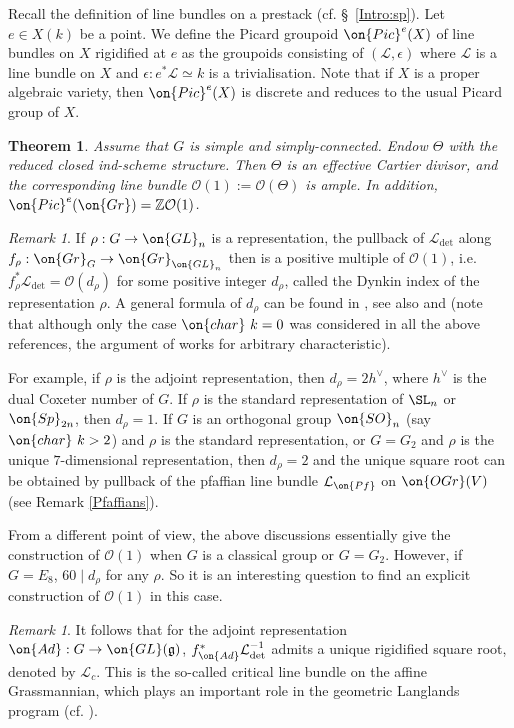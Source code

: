 \documentclass[]{pcmi}
\theoremstyle{plain}
\newtheorem{thm}[equation]{Theorem}
\theoremstyle{remark}
\newtheorem{rmk}[equation]{Remark}
\theoremstyle{definition}
\newcommand{\frakg}{{\mathfrak g}}
\newcommand{\bZ}{{\mathbb Z}}
\newcommand{\mL}{{\mathcal L}}
\newcommand{\mO}{{\mathcal O}}
\newcommand{\Ad}{{\on{Ad}}}
\newcommand{\cha}{{\on{char}}}
\newcommand{\Gr}{{\on{Gr}}}
\newcommand{\Pic}{{\on{Pic}}}
\newcommand{\GL}{{\on{GL}}}
\begin{document}
Recall the definition of line bundles on a prestack (cf. \S~\ref{Intro:sp}).
Let $e\in X(k)$ be a point. We define the Picard groupoid $\Pic^e(X)$ of line bundles on $X$ rigidified at $e$ as the groupoids consisting of $(\mL,\epsilon)$ where $\mL$ is a line bundle on $X$ and $\epsilon: e^*\mL\simeq k$ is a trivialisation.
Note that if $X$ is a proper algebraic variety, then $\Pic^e(X)$ is discrete and reduces to the usual Picard group of $X$.


\begin{thm}\label{Pic of Gr}
Assume that $G$ is simple and simply-connected.
Endow $\Theta$
with the reduced closed ind-scheme structure. Then $\Theta$ is an effective Cartier divisor, and the corresponding line bundle $\mO(1):=\mO(\Theta)$ is ample. In addition, $\Pic^e(\Gr)=\bZ\mO(1)$.
\end{thm}



\begin{rmk}\label{generator}
If $\rho: G\to \GL_n$ is a representation, the pullback of $\mL_{\det}$ along $f_\rho:\Gr_G\to \Gr_{\GL_n}$ then is a positive multiple of $\mO(1)$, i.e. $f_\rho^*\mL_{\det}=\mO(d_\rho)$ for some positive integer $d_\rho$, called the Dynkin index of the representation $\rho$. A general formula of $d_\rho$ can be found in \cite[Lemma 5.2]{KNR}, see also \cite[Lemma 10.6.1]{So} and \cite[Lemma 4.2]{YZ} (note that although only the case $\cha\ k=0$ was considered in all the above references, the argument of \cite[Lemma 4.2]{YZ} works for arbitrary characteristic).

For example, if $\rho$ is the adjoint representation, then $d_\rho=2h^\vee$, where $h^\vee$ is the dual Coxeter number of $G$. If $\rho$ is the standard representation of $\SL_n$ or $\on{Sp}_{2n}$, then $d_\rho=1$. If $G$ is an orthogonal group $\on{SO}_n$ (say $\cha\ k>2$) and $\rho$ is the standard representation, or $G=G_2$ and $\rho$ is the unique $7$-dimensional representation, then $d_\rho=2$ and the unique square root can be obtained by pullback of the pfaffian line bundle $\mL_{\on{Pf}}$ on $\on{OGr}(V)$ (see Remark \ref{Pfaffians}). 

From a different point of view, the above discussions essentially give the construction of $\mO(1)$ when $G$ is a classical group or $G=G_2$.
However, if $G=E_8$, $60\mid d_\rho$ for any $\rho$. So it is an interesting question to find an explicit construction of $\mO(1)$ in this case.
\end{rmk}

\begin{rmk}\label{square root of adjoint}
It follows that for the adjoint representation $\Ad: G\to \GL(\frakg)$, $f_{\Ad}^*\mL^{-1}_{\det}$ admits a unique rigidified square root, denoted by $\mL_{c}$. This is the so-called critical line bundle on the affine Grassmannian, which plays an important role in the geometric Langlands program (cf. \cite{BD}). 
\end{rmk}
\end{document}
